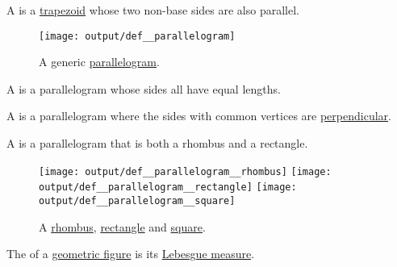 \begin{definition}\label{def:parallelogram}
  A  is a \hyperref[def:trapezoid]{trapezoid} whose two non-base sides are also parallel.

  \begin{figure}[!ht]
    \centering
    \texttt{[image: output/def\_\_parallelogram]}
    \caption{A generic \hyperref[def:parallelogram]{parallelogram}.}\label{fig:def:parallelogram}
  \end{figure}

  \begin{thmenum}
     A  is a parallelogram whose sides all have equal lengths.

     A  is a parallelogram where the sides with common vertices are \hyperref[def:perpendicularity]{perpendicular}.

     A  is a parallelogram that is both a rhombus and a rectangle.

    \begin{figure}[!ht]
      \hfill
      \texttt{[image: output/def\_\_parallelogram\_\_rhombus]}
      \hfill
      \hfill
      \texttt{[image: output/def\_\_parallelogram\_\_rectangle]}
      \hfill
      \hfill
      \texttt{[image: output/def\_\_parallelogram\_\_square]}
      \hfill
      \hfill
      \caption{A \hyperref[def:parallelogram/rhombus]{rhombus}, \hyperref[def:parallelogram/rectangle]{rectangle} and \hyperref[def:parallelogram/square]{square}.}\label{fig:def:parallelogram/rhombus}
    \end{figure}
  \end{thmenum}
\end{definition}

\begin{definition}\label{def:figure_area}\mimprovised
  The  of a \hyperref[rem:geometric_shape]{geometric figure} is its \hyperref[def:lebesgue_measure]{Lebesgue measure}.
\end{definition}

